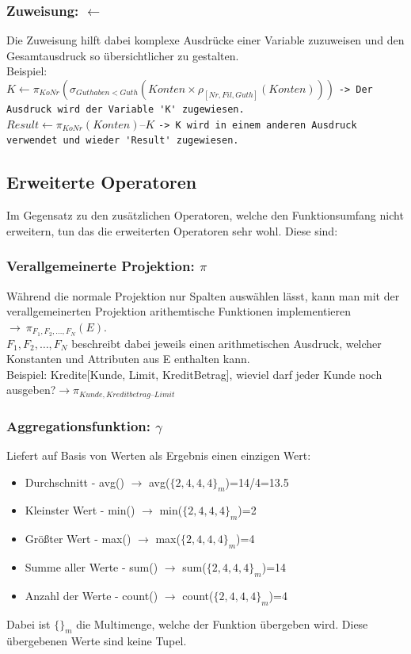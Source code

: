 \documentclass{article}
\begin{document}
 	\subsubsection{Zuweisung: \texorpdfstring{$\gets$}{}}
 	Die Zuweisung hilft dabei komplexe Ausdrücke einer Variable zuzuweisen und den Gesamtausdruck so übersichtlicher zu gestalten. \\
 	Beispiel: \\
 	$K\gets \pi_{KoNr}(\sigma_{Guthaben<Guth}(Konten\times\rho_{[Nr, Fil, Guth]}(Konten)))$ \verb|-> Der Ausdruck wird der Variable 'K' zugewiesen.| \\
 	$Result\gets\pi_{KoNr}(Konten) \text{--} K$ \verb|-> K wird in einem anderen Ausdruck verwendet und wieder 'Result' zugewiesen. |
 	\subsection{Erweiterte Operatoren}
 	Im Gegensatz zu den zusätzlichen Operatoren, welche den Funktionsumfang nicht erweitern, tun das die erweiterten Operatoren sehr wohl. Diese sind:
 	\subsubsection{Verallgemeinerte Projektion: \texorpdfstring{$\pi$}{}}
 	Während die normale Projektion nur Spalten auswählen lässt, kann man mit der verallgemeinerten Projektion arithemtische Funktionen implementieren $\to\ \pi_{F_1, F_2, \ldots, F_N}(E).$ \\
 	$F_1, F_2,\ldots, F_N$ beschreibt dabei jeweils einen arithmetischen Ausdruck, welcher Konstanten und Attributen aus E enthalten kann. \\
 	Beispiel: Kredite[Kunde, Limit, KreditBetrag], wieviel darf jeder Kunde noch ausgeben?$\to \pi_{Kunde,Kreditbetrag\text{--}Limit}$
 	\subsubsection{Aggregationsfunktion: \texorpdfstring{$\gamma$}{}}
 	Liefert auf Basis von Werten als Ergebnis einen einzigen Wert:
 	\begin{itemize}
 		\item{Durchschnitt - avg() $\to$ avg($\{2,4,4,4\}_m$)=14/4=13.5}
 		\item{Kleinster Wert - min() $\to$ min($\{2,4,4,4\}_m$)=2}
 		\item{Größter Wert - max() $\to$ max($\{2,4,4,4\}_m$)=4}
 		\item{Summe aller Werte - sum() $\to$ sum($\{2,4,4,4\}_m$)=14}
 		\item{Anzahl der Werte - count() $\to$ count($\{2,4,4,4\}_m$)=4}
 	\end{itemize}
 	Dabei ist $\{\}_m$ die Multimenge, welche der Funktion übergeben wird. Diese übergebenen Werte sind keine Tupel.
\end{document}
